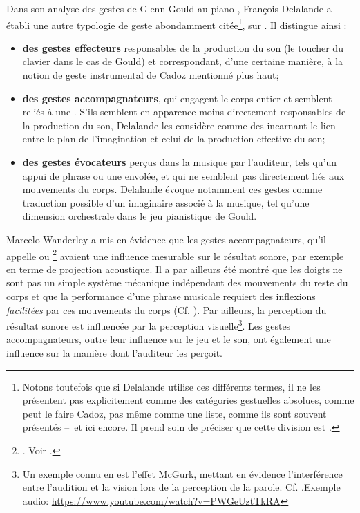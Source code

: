 \noindent Dans son analyse des gestes de Glenn Gould au piano \cite{delalande_geste_1988}, François Delalande a établi une autre typologie de geste abondamment citée\footnote{Notons toutefois que si Delalande utilise ces différents termes, il ne les présentent pas explicitement comme des catégories gestuelles absolues, comme peut le faire Cadoz, pas même comme une liste, comme ils sont souvent présentés --~et ici encore. Il prend soin de préciser que cette division est  \cite{delalande_geste_1988}.}, sur . Il distingue ainsi :
\vspace{-1em}
\begin{itemize}[noitemsep]
	\item \textbf{des gestes effecteurs} responsables de la production du son (le toucher du clavier dans le cas de Gould) et correspondant, d'une certaine manière, à la notion de geste instrumental de Cadoz mentionné plus haut;
	\item \textbf{des gestes accompagnateurs}, qui engagent le corps entier et semblent reliés à une . S'ils semblent en apparence moins directement responsables de la production du son, Delalande les considère comme des  incarnant le lien entre le plan de l'imagination et celui de la production effective du son;
	\item \textbf{des gestes évocateurs} perçus dans la musique par l'auditeur, tels qu'un appui de phrase ou une envolée, et qui ne semblent pas directement liés aux mouvements du corps. Delalande évoque notamment ces gestes comme traduction possible d'un imaginaire associé à la musique, tel qu'une dimension orchestrale dans le jeu pianistique de Gould.
\end{itemize}
\noindent Marcelo Wanderley a mis en évidence que les gestes accompagnateurs, qu'il appelle  ou \footnote{. Voir \cite{wanderley_non-obvious_1999}.} avaient une influence mesurable sur le résultat sonore, par exemple en terme de projection acoustique. Il a par ailleurs été montré que les doigts ne sont pas un simple système mécanique indépendant des mouvements du reste du corps et que la performance d'une phrase musicale requiert des inflexions \textit{facilitées} par ces mouvements du corps (Cf. \cite{chadefaux_experimental_2012}). Par ailleurs, la perception du résultat sonore est influencée par la perception visuelle\footnote{\label{fn:mcgurk} Un exemple connu en est l'effet McGurk, mettant en évidence l'interférence entre l'audition et la vision lors de la perception de la parole. Cf. \cite{macdonald_visual_1978}.Exemple audio: \url{https://www.youtube.com/watch?v=PWGeUztTkRA}}. Les gestes accompagnateurs, outre leur influence sur le jeu et le son, ont également une influence sur la manière dont l'auditeur les perçoit.

